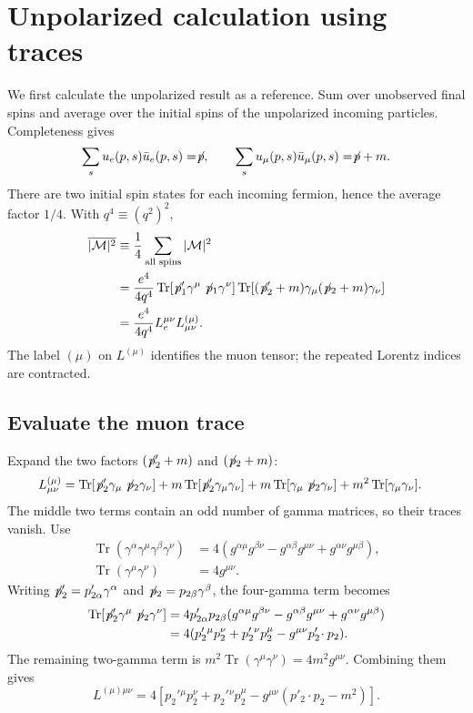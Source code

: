 \documentclass[12pt,a4paper]{article}
\numberwithin{equation}{section}
\newcommand{\M}{\mathcal M}
\newcommand{\slsh}[1]{\not\!#1}
\begin{document}
\section{Unpolarized calculation using traces}
\label{sec:unpolarized}
We first calculate the unpolarized result as a reference. Sum over unobserved final spins and average over the initial spins of the unpolarized incoming particles. Completeness gives
\begin{equation}
 \sum_s u_e(p,s)\bar u_e(p,s)=\slsh p,\qquad
 \sum_s u_\mu(p,s)\bar u_\mu(p,s)=\slsh p+m.
\end{equation}
There are two initial spin states for each incoming fermion, hence the average
factor $1/4$. With $q^4\equiv(q^2)^2$,
\begin{align}
 \overline{|\M|^2}
 &\equiv\frac14\sum_{\text{all spins}}|\M|^2\\
 &=\frac{e^4}{4q^4}
 \operatorname{Tr}[\slsh p'_1\gamma^\mu\slsh p_1\gamma^\nu]
 \operatorname{Tr}[(\slsh p'_2+m)\gamma_\mu(\slsh p_2+m)\gamma_\nu]\\
 &=\frac{e^4}{4q^4}L_e^{\mu\nu}L^{(\mu)}_{\mu\nu}.
 \label{eq:trace-start}
\end{align}
The label $(\mu)$ on $L^{(\mu)}$ identifies the muon tensor; the repeated
Lorentz indices are contracted.

\subsection{Evaluate the muon trace}
Expand the two factors $(\slsh p'_2+m)$ and $(\slsh p_2+m)$:
\begin{align}
 L^{(\mu)}_{\mu\nu}
 &=\operatorname{Tr}[\slsh p'_2\gamma_\mu\slsh p_2\gamma_\nu]
 +m\operatorname{Tr}[\slsh p'_2\gamma_\mu\gamma_\nu]
 +m\operatorname{Tr}[\gamma_\mu\slsh p_2\gamma_\nu]
 +m^2\operatorname{Tr}[\gamma_\mu\gamma_\nu].
\end{align}
The middle two terms contain an odd number of gamma matrices, so their traces
vanish. Use
\begin{align}
 \operatorname{Tr}(\gamma^\alpha\gamma^\mu\gamma^\beta\gamma^\nu)
 &=4(g^{\alpha\mu}g^{\beta\nu}-g^{\alpha\beta}g^{\mu\nu}
       +g^{\alpha\nu}g^{\mu\beta}),\\
 \operatorname{Tr}(\gamma^\mu\gamma^\nu)&=4g^{\mu\nu}.
\end{align}
Writing $\slsh p'_2=p'_{2\alpha}\gamma^\alpha$ and
$\slsh p_2=p_{2\beta}\gamma^\beta$, the four-gamma term becomes
\begin{align}
 \operatorname{Tr}[\slsh p'_2\gamma^\mu\slsh p_2\gamma^\nu]
 &=4p'_{2\alpha}p_{2\beta}
 (g^{\alpha\mu}g^{\beta\nu}-g^{\alpha\beta}g^{\mu\nu}
       +g^{\alpha\nu}g^{\mu\beta})\\
 &=4(p_2'{}^\mu p_2^\nu+p_2'{}^\nu p_2^\mu
       -g^{\mu\nu}p'_2\!\cdot p_2).
\end{align}
The remaining two-gamma term is
$m^2\operatorname{Tr}(\gamma^\mu\gamma^\nu)=4m^2g^{\mu\nu}$.
Combining them gives
\begin{equation}
 L^{(\mu)\mu\nu}=4\left[p_2'{}^\mu p_2^\nu+p_2'{}^\nu p_2^\mu
 -g^{\mu\nu}(p'_2\!\cdot p_2-m^2)\right].
 \label{eq:muon-trace}
\end{equation}
\end{document}
